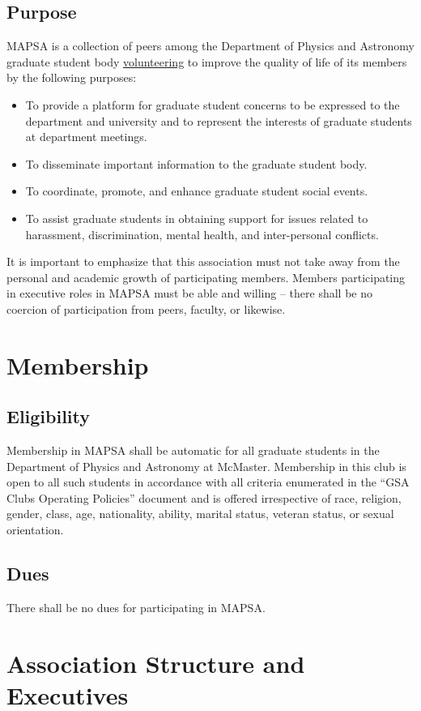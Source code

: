 \documentclass[8pt]{article}
\begin{document}
	\subsection{Purpose}
	MAPSA is a collection of peers among the Department of Physics and Astronomy graduate student body \underline{volunteering} to improve the quality of life of its members by the following purposes:
	\begin{itemize}
		\item To provide a platform for graduate student concerns to be expressed to the department and university and to represent the interests of graduate students at department meetings.
		\item To disseminate important information to the graduate student body.
		\item To coordinate, promote, and enhance graduate student social events.
		\item To assist graduate students in obtaining support for issues related to harassment, discrimination, mental health, and inter-personal conflicts.
	\end{itemize}
	It is important to emphasize that this association must not take away from the personal and academic growth of participating members. Members participating in executive roles in MAPSA must be able and willing -- there shall be no coercion of participation from peers, faculty, or likewise.
	
	\section{Membership}
	\subsection{Eligibility}
	Membership in MAPSA shall be automatic for all graduate students in the Department of Physics and Astronomy at McMaster. Membership in this club is open to all such students in accordance with all criteria enumerated in the ``GSA Clubs Operating Policies'' document and is offered irrespective of race, religion, gender, class, age, nationality, ability, marital status, veteran status, or sexual orientation.
	
	\subsection{Dues}
	There shall be no dues for participating in MAPSA.
	
	\section{Association Structure and Executives}
\end{document}
